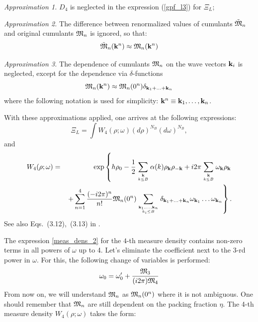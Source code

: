 {\it Approximation 1.} $D_4$ is neglected in the expression (\ref{gpf_l3}) for $\Xi_L$;

{\it Approximation 2.} The difference between renormalized values of cumulants $\tilde{\frak M}_n$ and original cumulants $\frak M_n$ is ignored, so that:
\begin{equation}
\tilde{\frak M}_n(\vb k^n) \approx \frak M_n(\vb k^n)
\end{equation}

{\it Approximation 3.} The dependence of cumulants $\frak M_n$ on the wave vectors $\vb k_i$ is neglected, except for the dependence via $\delta$-functions
\begin{equation}
\frak{M}_n({\vb k}^n) \approx \frak{M}_n(0^n) \delta_{\vb{k}_1 + \dotsc + \vb{k}_n}
\end{equation}
where the following notation is used for simplicity: ${\vb k}^n\equiv {\vb k}_1, \dotsc, {\vb k}_n$.

With these approximations applied, one arrives at the following expressions:
\begin{equation}
\label{gpf_l4}
\Xi_L = \int W_4 (\rho;\omega) (d\rho)^{N_B}(d\omega)^{N_B}, 
\end{equation}
and
\begin{eqnarray}
	\label{meas_dens_2}
	W_4(\rho;\omega) &=& \exp \left\{ h\rho_0
	- \frac12  \sum\limits_{{\vb k}\atop k\le B} \alpha(k) \rho_{\vb k} \rho_{-{\vb k}}
	+ i2\pi \sum\limits_{{\vb k} \atop k\le B} \omega_{\vb k} \rho_{\vb k} \right.  \nonumber\\
	&& \left.+
	\sum\limits_{n=1}^4 \frac{(-i2\pi)^n}{n!} 
	{\frak M}_n(0^n)
	\sum\limits_{\vb{k}_1,\dotsc,\vb{k}_n\atop{k_i \le B}}
	\delta_{\vb{k}_1 + \dotsc + \vb{k}_n} 
	\omega_{{\vb k}_1} \dots \omega_{{\vb k}_n} \right\}.
\end{eqnarray}
See also Eqs.~(3.12),~(3.13) in \cite{Yukh1990}.

The expression \ref{meas_dens_2} for the $4$-th measure density contains non-zero terms in all powers of $\omega$ up to 4. Let's eliminate the coefficient next to the 3-rd power in $\omega$. For this, the following change of variables is performed:
\begin{equation}
\omega_0 = \omega'_0 + \frac{\frak M_3}{(i2\pi) \frak M_4}
\end{equation}
From now on, we will understand $\frak M_n$ as $\frak{M}_n(0^n)$ where it is not ambiguous. One should remember that $\frak M_n$ are still dependent on the packing fraction $\eta$.
The 4-th measure density $W_4(\rho; \omega)$ takes the form:

